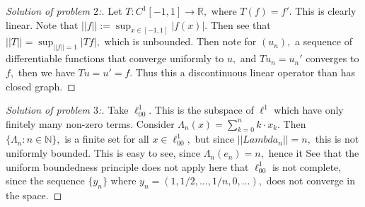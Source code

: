 \documentclass[letterpaper,11pt,twoside]{article}
\theoremstyle{proposition}
\theoremstyle{definition}
\theoremstyle{theorem}
\theoremstyle{definition}
\theoremstyle{definition}
\theoremstyle{definition}
\theoremstyle{lemma}
\theoremstyle{definition}
\theoremstyle{definition}
\theoremstyle{corollary}
\theoremstyle{definition}
\theoremstyle{definition}
\theoremstyle{definition}
\newcommand{\norm}[1]{\left \vert \left \vert #1 \right \vert \right \vert}
\begin{document}
\begin{proof}[Solution of problem $2$:]
	Let $T: C^1[-1,1] \to \mathbb{R},$ where $T(f)=f'.$ This is clearly linear. Note that $\norm{f}:= \sup_{x \in [-1,1]} |f(x)|.$ Then see that $\norm{T}= 
	\sup_{\norm{f}=1}|Tf|,$ which is unbounded. Then note for $(u_n),$ a sequence of differentiable functions that converge uniformly to $u,$ and 
	$Tu_n=u_n'$ converges to $f,$ then we have $Tu=u'=f.$ Thus this a discontinuous linear operator than has closed graph.   
\end{proof}
\begin{proof}[Solution of problem $3$:]
	Take $\ell^{1}_{00}.$ This is the subspace of $\ell^1$ which have only finitely many non-zero terms. Consider $\Lambda_{n}(x)= \sum_{k=0}^{n}k \cdot 
	x_k.$ Then $\{\Lambda_n: n \in \mathbb{N}\},$ is a finite set for all $x \in \ell^{1}_{00},$ but since $\norm{Lambda_n}=n,$ this is not uniformly 
	bounded. This is easy to see, since $\Lambda_{n}(e_n)=n,$ hence it  See that the uniform boundedness principle does not apply here that $\ell^1_{00}$ is 
	not complete, since the sequence $\{y_n\}$  where $y_n= (1, 1/2, \dots, 1/n, 0 ,\dots),$ does not converge in the space.  
\end{proof}
\end{document}
